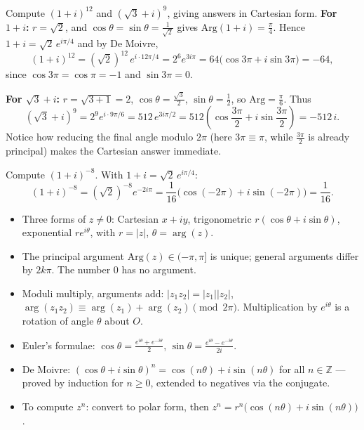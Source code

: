 \documentclass[11pt]{article}
\begin{document}
\begin{exoresolu}
Compute $(1 + i)^{12}$ and $(\sqrt{3} + i)^9$, giving answers in Cartesian form.
\tcblower
\textbf{For $1 + i$:} $r = \sqrt{2}$, and $\cos\theta = \sin\theta = \frac{1}{\sqrt{2}}$ gives $\mathrm{Arg}(1+i) = \frac{\pi}{4}$. Hence $1 + i = \sqrt{2}\,e^{i\pi/4}$ and by De Moivre,
\[ (1+i)^{12} = (\sqrt{2})^{12}\,e^{i \cdot 12\pi/4} = 2^6 e^{3i\pi} = 64\bigl(\cos 3\pi + i\sin 3\pi\bigr) = -64, \]
since $\cos 3\pi = \cos\pi = -1$ and $\sin 3\pi = 0$.

\textbf{For $\sqrt{3} + i$:} $r = \sqrt{3+1} = 2$, $\cos\theta = \frac{\sqrt{3}}{2}$, $\sin\theta = \frac{1}{2}$, so $\mathrm{Arg} = \frac{\pi}{6}$. Thus
\[ (\sqrt{3}+i)^9 = 2^9 e^{i \cdot 9\pi/6} = 512\,e^{3i\pi/2} = 512\left(\cos\frac{3\pi}{2} + i\sin\frac{3\pi}{2}\right) = -512\,i. \]
Notice how reducing the final angle modulo $2\pi$ (here $3\pi \equiv \pi$, while $\frac{3\pi}{2}$ is already principal) makes the Cartesian answer immediate.
\end{exoresolu}

\begin{exemplebox}
Compute $(1 + i)^{-8}$. With $1 + i = \sqrt{2}\,e^{i\pi/4}$:
\[ (1+i)^{-8} = (\sqrt{2})^{-8} e^{-2i\pi} = \frac{1}{16}\bigl(\cos(-2\pi) + i\sin(-2\pi)\bigr) = \frac{1}{16}. \]
\end{exemplebox}

\begin{aretenir}
\begin{itemize}
\item Three forms of $z \neq 0$: Cartesian $x + iy$, trigonometric $r(\cos\theta + i\sin\theta)$, exponential $re^{i\theta}$, with $r = |z|$, $\theta = \arg(z)$.
\item The principal argument $\mathrm{Arg}(z) \in (-\pi, \pi]$ is unique; general arguments differ by $2k\pi$. The number $0$ has no argument.
\item Moduli multiply, arguments add: $|z_1z_2| = |z_1||z_2|$, $\arg(z_1z_2) \equiv \arg(z_1) + \arg(z_2) \pmod{2\pi}$. Multiplication by $e^{i\theta}$ is a rotation of angle $\theta$ about $O$.
\item Euler's formulae: $\cos\theta = \frac{e^{i\theta}+e^{-i\theta}}{2}$, $\sin\theta = \frac{e^{i\theta}-e^{-i\theta}}{2i}$.
\item De Moivre: $(\cos\theta + i\sin\theta)^n = \cos(n\theta) + i\sin(n\theta)$ for all $n \in \mathbb{Z}$ --- proved by induction for $n \geq 0$, extended to negatives via the conjugate.
\item To compute $z^n$: convert to polar form, then $z^n = r^n\bigl(\cos(n\theta) + i\sin(n\theta)\bigr)$.
\end{itemize}
\end{aretenir}
\end{document}
